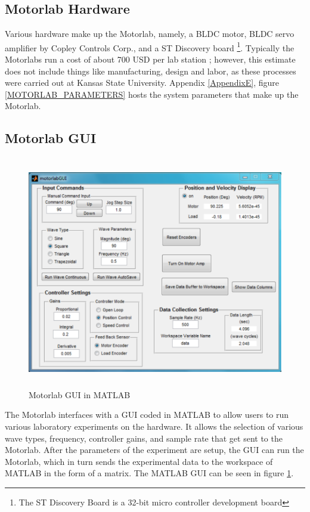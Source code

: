 \subsection{Motorlab Hardware}
Various hardware make up the Motorlab, namely, a BLDC motor, BLDC servo amplifier by Copley Controls Corp., and a ST Discovery board \footnote{The ST Discovery Board is a 32-bit micro controller development board}. Typically the Motorlabs run a cost of about 700 USD per lab station \citep{4}; however, this estimate does not include things like manufacturing, design and labor, as these processes were carried out at Kansas State University. Appendix \ref{AppendixE}, figure \ref{MOTORLAB_PARAMETERS} hosts the system parameters that make up the Motorlab.

\subsection{Motorlab GUI}
\label{makereference2.1.4} 
\begin{figure}[H]
	\begin{center}
		\includegraphics[height=4in]{figures/old_motorlab_gui.png}
		
		\caption[Motorlab GUI in MATLAB]{Motorlab GUI in MATLAB}
		
		\label{motorlab_gui_in_matlab}
	\end{center}
\end{figure}

The Motorlab interfaces with a \ac{GUI} coded in MATLAB to allow users to run various laboratory experiments on the hardware. It allows the selection of various wave types, frequency, controller gains, and sample rate that get sent to the Motorlab. After the parameters of the experiment are setup, the GUI can run the Motorlab, which in turn sends the experimental data to the workspace of MATLAB in the form of a matrix. The MATLAB GUI can be seen in figure \ref{motorlab_gui_in_matlab}.
